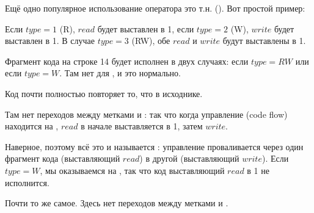 ﻿

Ещё одно популярное использование оператора  это т.н.  ().
Вот простой пример:



Если $type=1$ (R), $read$ будет выставлен в 1, если $type=2$ (W), $write$ будет выставлен в 1.
В случае $type=3$ (RW), обе $read$ и $write$ будут выставлены в 1.

Фрагмент кода на строке 14 будет исполнен в двух случаях: если $type=RW$ или если $type=W$.
Там нет  для , и это нормально.




Код почти полностью повторяет то, что в исходнике.

Там нет переходов между метками  и 
: так что когда управление (code flow) находится на 
, $read$ в начале выставляется в 1, затем $write$.

Наверное, поэтому всё это и называется : управление проваливается через
один фрагмент кода (выставляющий $read$) в другой (выставляющий $write$).
Если $type=W$, мы оказываемся на , 
так что код выставляющий $read$ в 1 не исполнится.




Почти то же самое.
Здесь нет переходов между метками  и .


